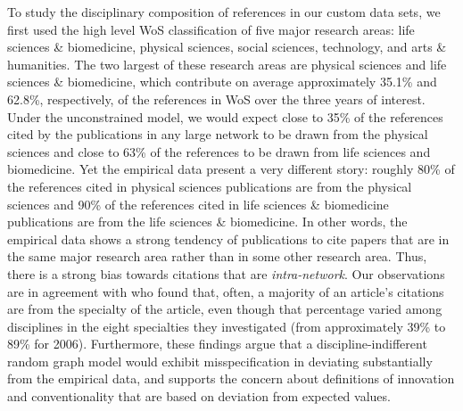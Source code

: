 \documentclass[NETN]{stjour}
\begin{document}
To study the disciplinary composition of references in our custom data sets, we first used the high level WoS classification of five major research areas: life sciences \& biomedicine, physical sciences, social sciences, technology, and arts \& humanities. The two largest of these research areas are physical sciences and life sciences \& biomedicine, which contribute on average approximately 35.1\% and 62.8\%, respectively, of the references in WoS over the three years of interest. Under the unconstrained model, we would expect close to 35\% of the references cited by the publications in any large network  to be drawn from the physical sciences and close to 63\% of the references to be drawn from  life sciences and biomedicine. Yet the empirical data present a very different  story: roughly 80\% of the references cited in physical sciences publications are from the physical sciences and 90\% of the references cited in life sciences \& biomedicine publications are from the life sciences \& biomedicine. In other words, the empirical data shows a strong tendency of publications to cite papers that are in the same major research area rather than in some other research area.  Thus, there is a strong bias towards citations that are {\em intra-network}. Our observations are in agreement with \cite{wallace_lariviere_gingras_2012} who found that, often, a majority of an article's citations are from the specialty of the article, even though that percentage varied among disciplines in the eight specialties they investigated (from approximately 39\% to 89\% for 2006). Furthermore, these findings argue that a discipline-indifferent random graph model would exhibit misspecification in deviating substantially from the empirical data, and supports the  concern about definitions of  innovation and conventionality that are based on deviation from expected values. 
\end{document}
